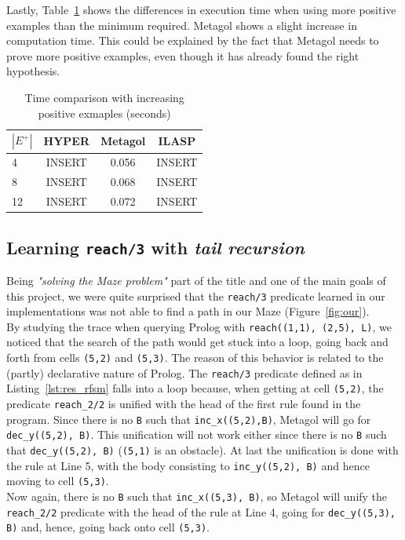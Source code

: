 Lastly, Table~\ref{tab:ex_cmp} shows the differences in execution time when using more positive examples than the minimum required. Metagol shows a slight 
increase in computation time. This could be explained by the fact that Metagol needs to prove more positive examples, even though it has already
found the right hypothesis.

{
\begin{center}
    \begin{table}[h]
    \centering
    \begin{tabular}{ |l|c|c|c| } 
        \hline
        \(|E^+|\) & \textbf{HYPER} & \textbf{Metagol} & \textbf{ILASP} \\ \hline
        4 & INSERT & 0.056 & INSERT \\ 
        8 & INSERT & 0.068 & INSERT \\
        12 & INSERT & 0.072 & INSERT \\  
        \hline
    \end{tabular}
    \caption{\label{tab:ex_cmp}Time comparison with increasing positive exmaples (seconds)}
\end{table}
\end{center}
}

\subsection{Learning \texttt{reach/3} with \emph{tail recursion}}
Being \emph{"solving the Maze problem"} part of the title and one of the main goals of this project, we were
quite surprised that the \texttt{reach/3} predicate learned in our implementations was not able to find a path
in our Maze (Figure~\ref{fig:our}).\\
By studying the trace when querying Prolog with \texttt{reach((1,1), (2,5), L)},
we noticed that the search of the path would get stuck into a loop, going back and forth from cells \texttt{(5,2)} and
\texttt{(5,3)}. The reason of this behavior is related to the (partly) declarative nature of Prolog. The \texttt{reach/3}
predicate defined as in Listing~\ref{lst:res_rfsm} falls into a loop because, when getting at cell \texttt{(5,2)},
the predicate \texttt{reach\_2/2} is unified with the head of the first rule found in the program. Since there is
no \texttt{B} such that \texttt{inc\_x((5,2),B)}, Metagol will go for \texttt{dec\_y((5,2), B)}. This unification
will not work either since there is no \texttt{B} such that \texttt{dec\_y((5,2), B)} (\texttt{(5,1)} is an obstacle). At
last the unification is done with the rule at Line 5, with the body consisting to \texttt{inc\_y((5,2), B)} and hence moving
to cell \texttt{(5,3)}.\\
Now again, there is no \texttt{B} such that \texttt{inc\_x((5,3), B)}, so Metagol will unify the
\texttt{reach\_2/2} predicate with the head of the rule at Line 4, going for \texttt{dec\_y((5,3), B)} and, hence,
going back onto cell \texttt{(5,3)}.\\

